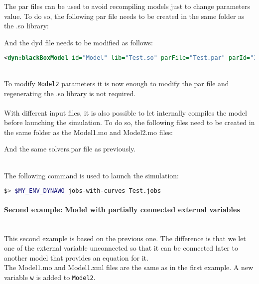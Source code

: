 \documentclass[a4paper, 12pt]{report}
\begin{document}
The \Dynawo par files can be used to avoid recompiling models just to change parameters value. To do so, the following par file needs to be created in the same folder as the .so library:


And the dyd file needs to be modified as follows:
\begin{lstlisting}[language=XML]
<dyn:blackBoxModel id="Model" lib="Test.so" parFile="Test.par" parId="1"/>
\end{lstlisting}

~~\\
To modify \lstinline[language=Modelica]{Model2} parameters it is now enough to modify the par file and regenerating the .so library is not required. \\

~~\\
With different input files, it is also possible to let \Dynawo internally compiles the model before launching the simulation. To do so, the following files need to be created in the same folder as the Model1.mo and Model2.mo files:




And the same solvers.par file as previously.

~~\\
The following command is used to launch the simulation:
\begin{lstlisting}[language=bash,deletekeywords={jobs,help}]
$> $MY_ENV_DYNAWO jobs-with-curves Test.jobs
\end{lstlisting}


\paragraph{Second example: Model with partially connected external variables}
 ~~\\
This second example is based on the previous one. The difference is that we let one of the external variable unconnected so that it can be connected later to another model that provides an equation for it. \\
The Model1.mo and Model1.xml files are the same as in the first example.
A new variable \lstinline[language=Modelica]{w} is added to
\lstinline[language=Modelica]{Model2}.


\end{document}
